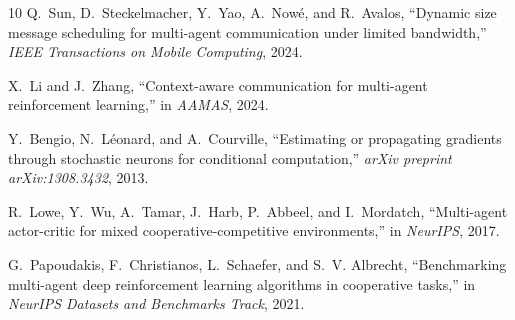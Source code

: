 \documentclass[10pt,twocolumn,letterpaper]{article}
\begin{document}
\begin{thebibliography}{10}
Q.~Sun, D.~Steckelmacher, Y.~Yao, A.~Now{\'e}, and R.~Avalos, ``Dynamic size message scheduling for multi-agent communication under limited bandwidth,'' \emph{IEEE Transactions on Mobile Computing}, 2024.

X.~Li and J.~Zhang, ``Context-aware communication for multi-agent reinforcement learning,'' in \emph{AAMAS}, 2024.

Y.~Bengio, N.~L{\'e}onard, and A.~Courville, ``Estimating or propagating gradients through stochastic neurons for conditional computation,'' \emph{arXiv preprint arXiv:1308.3432}, 2013.

R.~Lowe, Y.~Wu, A.~Tamar, J.~Harb, P.~Abbeel, and I.~Mordatch, ``Multi-agent actor-critic for mixed cooperative-competitive environments,'' in \emph{NeurIPS}, 2017.

G.~Papoudakis, F.~Christianos, L.~Schaefer, and S.~V. Albrecht, ``Benchmarking multi-agent deep reinforcement learning algorithms in cooperative tasks,'' in \emph{NeurIPS Datasets and Benchmarks Track}, 2021.

\end{thebibliography}
\end{document}
